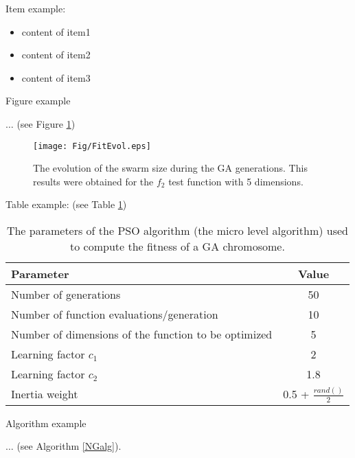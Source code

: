 \documentclass[runningheads,a4paper,11pt]{report}
\begin{document}
Item example:

\begin{itemize}
	\item content of item1
 	\item content of item2
 	\item content of item3
\end{itemize}



Figure example

$\ldots$ (see Figure \ref{swarmsize})

\begin{figure}[htbp]
	\centerline{\texttt{[image: Fig/FitEvol.eps]}}
	\caption{The evolution of the swarm size during the GA generations. This results were obtained for the $f_2$ test function with 5 dimensions.}
	\label{swarmsize}
\end{figure}


Table example: (see Table \ref{tab3PSO})


\begin{table}[htbp]
	\caption{The parameters of the PSO algorithm (the micro level algorithm) used to compute the fitness of a GA chromosome.}
	\label{tab3PSO}
		\begin{center}
			\begin{tabular}{p{220pt}c}

				\textbf{Parameter}& \textbf{Value} \\
				\hline\hline
 				Number of generations& 50 \\
 				Number of function evaluations/generation& 10 \\
 				Number of dimensions of the function to be optimized& 5 \\
 				Learning factor $c_{1}$& 2 \\
 				Learning factor $c_{2}$ & 1.8\\
 				Inertia weight& 0.5 + $\frac{rand()}{2}$\\

			\end{tabular}
		\end{center}
\end{table}

Algorithm example

$\ldots$ (see Algorithm \ref{NGalg}).


\end{document}
